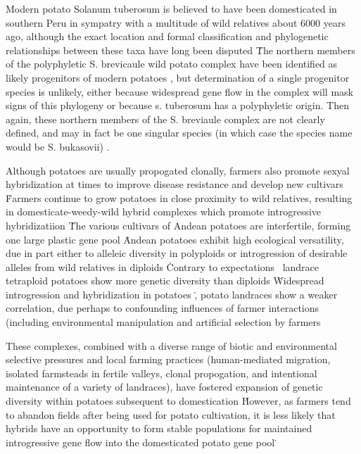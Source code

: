 \documentclass[11pt]{article}
\begin{document}
Modern potato Solanum tuberosum is believed to have been domesticated in southern Peru in sympatry with a multitude of wild relatives about 6000 years ago, although the exact location and formal classification and phylogenetic relationships between these taxa have long been disputed \cite{huaman2002reclassification, spooner2005single, pickersgill1977origins, hawkes1988evolution}\.
The northern members of the polyphyletic S. brevicaule wild potato complex have been identified as likely progenitors of modern potatoes \cite{correll1962potato}, but determination of a single progenitor species is unlikely, either because widespread gene flow in the complex will mask signs of this phylogeny or because s. tuberosum has a polyphyletic origin.
Then again, these northern members of the S. breviaule complex are not clearly defined, and may in fact be one singular species (in which case the species name would be S. bukasovii) \cite{spooner2005single}.

Although potatoes are usually propogated clonally, farmers also promote sexyal hybridization at times to improve disease resistance and develop new cultivars \cite{quiros1992increase}\.
Farmers continue to grow potatoes in close proximity to wild relatives, resulting in domesticate-weedy-wild hybrid complexes which promote introgressive hybridizatiion \cite{rabinowitz1990high, johns1987relationships, linder1987diversity}\.

The various cultivars of Andean potatoes are interfertile, forming one large plastic gene pool \cite{quiros1992increase}\.
Andean potatoes exhibit high ecological versatility, due in part either to alleleic diversity in polyploids or introgression of desirable alleles from wild relatives in diploids \cite{zimmerer1998ecogeography}\.

Contrary to expectations \cite{hamrick1983distribution}\, landrace tetraploid potatoes show more genetic diversity than diploids \cite{zimmerer1991geographical}\.

Widespread introgression and hybridization in potatoes \cite{grun1990evolution}\.

, potato landraces show a weaker correlation, due perhaps to confounding influences of farmer interactions (including environmental manipulation and artificial selection by farmers \cite{zimmerer1991geographical, [[cite other sources from page 45 in this paper}


These complexes, combined with a diverse range of biotic and environmental selective pressures and local farming practices (human-mediated migration, isolated farmsteads in fertile valleys, clonal propogation, and intentional maintenance of a variety of landraces), have fostered expansion of genetic diversity within potatoes subsequent to domestication \cite{brush1995potato}\.
However, as farmers tend to abandon fields after being used for potato cultivation, it is less likely that hybrids have an opportunity to form stable populations for maintained introgressive gene flow into the domesticated potato gene pool \cite{brush1995potato}\.
\end{document}
